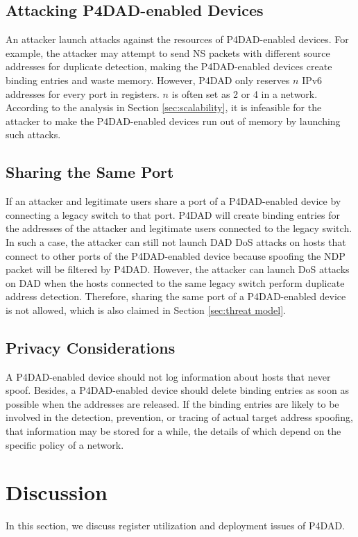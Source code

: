 \documentclass[a4paper,fleqn]{cas-dc}
\begin{document}
    \subsection{Attacking P4DAD-enabled Devices}
        An attacker launch attacks against the resources of P4DAD-enabled devices. For example, the attacker may attempt to send NS packets with different source addresses for duplicate detection, making the P4DAD-enabled devices create binding entries and waste memory. However, P4DAD only reserves $n$ IPv6 addresses for every port in registers. $n$ is often set as 2 or 4  in a network. According to the analysis in Section \ref{sec:scalability}, it is infeasible for the attacker to make the P4DAD-enabled devices run out of memory by launching such attacks.


    \subsection{Sharing the Same Port}
        If an attacker and legitimate users share a port of a P4DAD-enabled device by connecting a legacy switch to that port. P4DAD will create binding entries for the addresses of the attacker and legitimate users connected to the legacy switch. In such a case, the attacker can still not launch DAD DoS attacks on hosts that connect to other ports of the P4DAD-enabled device because spoofing the NDP packet will be filtered by P4DAD. However, the attacker can launch DoS attacks on DAD when the hosts connected to the same legacy switch perform duplicate address detection. Therefore, sharing the same port of a P4DAD-enabled device is not allowed, which is also claimed in Section \ref{sec:threat model}.
        

    \subsection{Privacy Considerations}
        A P4DAD-enabled device should not log information about hosts that never spoof. Besides, a P4DAD-enabled device should delete binding entries as soon as possible when the addresses are released. If the binding entries are likely to be involved in the detection, prevention, or tracing of actual target address spoofing, that information may be stored for a while, the details of which depend on the specific policy of a network.   
         


\section{Discussion}\label{sec:discussion}
    In this section, we discuss register utilization and deployment issues of P4DAD. 
\end{document}
